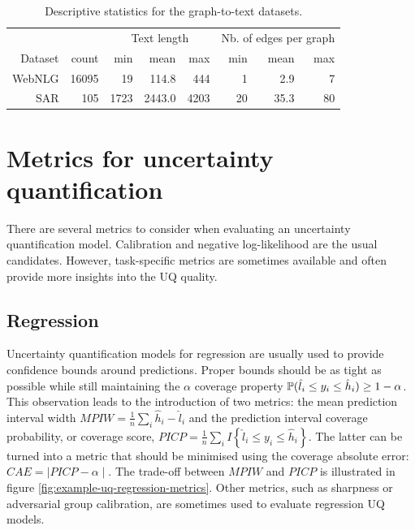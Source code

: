 \begin{table}
    \centering
        \caption{Descriptive statistics for the graph-to-text datasets.}
    \label{table:G2T-datasets-descriptive-stats}
    \begin{tabular}{rrrrrrrr}
\toprule
&  & \multicolumn{3}{c}{Text length} & \multicolumn{3}{c}{Nb. of edges per graph}  \\
    \cmidrule(rl){3-5} \cmidrule(rl){6-8} 
 Dataset &count&         min & mean & max &         min  & mean & max \\
\midrule
WebNLG  & 16095 & 19  &  114.8  & 444 &    1 & 2.9 & 7  \\
SAR      & 105 &  1723 &  2443.0 &  4203 &  20 &  35.3 &  80  \\
\bottomrule
\end{tabular}
\end{table}

\section{Metrics for uncertainty quantification}


There are several metrics to consider when evaluating an uncertainty quantification model. Calibration and negative log-likelihood are the usual candidates. However, task-specific metrics are sometimes available and often provide more insights into the UQ quality.

\subsection{Regression} \label{metrics:regression}

Uncertainty quantification models for regression are usually used to provide confidence bounds around predictions. Proper bounds should be as tight as possible while still maintaining the $\alpha$ coverage property $\operatorname{\mathbb{P}}( \hat l_i \leq y_i \leq \hat h_i) \geq 1 - \alpha$. This observation leads to the introduction of two metrics: the mean prediction interval width  $MPIW = \frac{1}{n} \sum_i \hat h_i - \hat l_i$ and the prediction interval coverage probability, or coverage score, $PICP = \frac{1}{n} \sum_i I\left\{\hat l_i \leq  y_i \leq \hat h_i\right\}$. The latter can be turned into a metric that should be minimised using the coverage absolute error: $CAE = \mid PICP - \alpha \mid$. The trade-off between $MPIW$ and $PICP$ is illustrated in figure \ref{fig:example-uq-regression-metrics}. Other metrics, such as sharpness or adversarial group calibration, are sometimes used to evaluate regression UQ models. 


